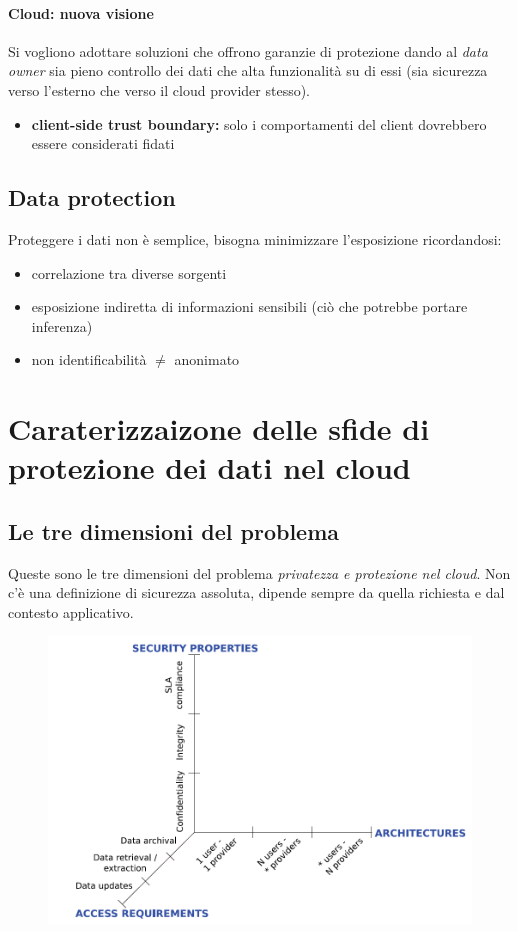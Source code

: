 \documentclass{report}
\begin{document}
\subsubsection{Cloud: nuova visione}
Si vogliono adottare soluzioni che offrono garanzie di protezione dando al \textit{data owner} sia pieno controllo dei dati che alta funzionalità su di essi (sia 
sicurezza verso l'esterno che verso il cloud provider stesso).
\begin{itemize}
    \item \textbf{client-side trust boundary:} solo i comportamenti del client dovrebbero essere considerati fidati
\end{itemize}


\section{Data protection}
Proteggere i dati non è semplice, bisogna minimizzare l'esposizione ricordandosi:
\begin{itemize}
    \item correlazione tra diverse sorgenti
    \item esposizione indiretta di informazioni sensibili (ciò che potrebbe portare inferenza)
    \item non identificabilità $ \neq $ anonimato
\end{itemize}

\chapter{Caraterizzaizone delle sfide di protezione dei dati nel cloud}
\section{Le tre dimensioni del problema}
Queste sono le tre dimensioni del problema \textit{privatezza e protezione nel cloud}.
Non c'è una definizione di sicurezza assoluta, dipende sempre da quella richiesta e dal contesto applicativo.
\begin{figure}[ht]
    \centering
    \includegraphics[width=1\linewidth]{images/3 dimensioni.png}
\end{figure}
\end{document}

